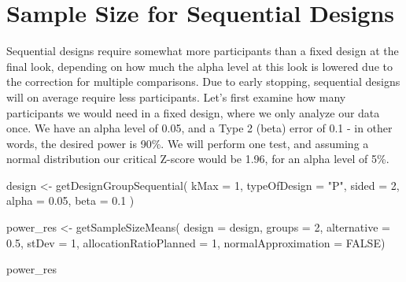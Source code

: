 \documentclass[
  oneside]{book}
\newenvironment{Shaded}{\begin{snugshade}}{\end{snugshade}}
\newcommand{\AttributeTok}[1]{\textcolor[rgb]{0.77,0.63,0.00}{#1}}
\newcommand{\ConstantTok}[1]{\textcolor[rgb]{0.00,0.00,0.00}{#1}}
\newcommand{\DecValTok}[1]{\textcolor[rgb]{0.00,0.00,0.81}{#1}}
\newcommand{\FloatTok}[1]{\textcolor[rgb]{0.00,0.00,0.81}{#1}}
\newcommand{\FunctionTok}[1]{\textcolor[rgb]{0.00,0.00,0.00}{#1}}
\newcommand{\NormalTok}[1]{#1}
\newcommand{\OtherTok}[1]{\textcolor[rgb]{0.56,0.35,0.01}{#1}}
\newcommand{\StringTok}[1]{\textcolor[rgb]{0.31,0.60,0.02}{#1}}
\begin{document}
\hypertarget{sample-size-for-sequential-designs}{%
\section{Sample Size for Sequential Designs}\label{sample-size-for-sequential-designs}}

Sequential designs require somewhat more participants than a fixed design at the final look, depending on how much the alpha level at this look is lowered due to the correction for multiple comparisons. Due to early stopping, sequential designs will on average require less participants. Let's first examine how many participants we would need in a fixed design, where we only analyze our data once. We have an alpha level of 0.05, and a Type 2 (beta) error of 0.1 - in other words, the desired power is 90\%. We will perform one test, and assuming a normal distribution our critical Z-score would be 1.96, for an alpha level of 5\%.

\begin{Shaded}
\begin{Highlighting}[]
\NormalTok{design }\OtherTok{\textless{}{-}} \FunctionTok{getDesignGroupSequential}\NormalTok{(}
  \AttributeTok{kMax =} \DecValTok{1}\NormalTok{,}
  \AttributeTok{typeOfDesign =} \StringTok{"P"}\NormalTok{,}
  \AttributeTok{sided =} \DecValTok{2}\NormalTok{,}
  \AttributeTok{alpha =} \FloatTok{0.05}\NormalTok{,}
  \AttributeTok{beta =} \FloatTok{0.1}
\NormalTok{)}

\NormalTok{power\_res }\OtherTok{\textless{}{-}} \FunctionTok{getSampleSizeMeans}\NormalTok{(}
  \AttributeTok{design =}\NormalTok{ design,}
  \AttributeTok{groups =} \DecValTok{2}\NormalTok{,}
  \AttributeTok{alternative =} \FloatTok{0.5}\NormalTok{, }
  \AttributeTok{stDev =} \DecValTok{1}\NormalTok{, }
  \AttributeTok{allocationRatioPlanned =} \DecValTok{1}\NormalTok{,}
  \AttributeTok{normalApproximation =} \ConstantTok{FALSE}\NormalTok{)}

\NormalTok{power\_res}
\end{Highlighting}
\end{Shaded}
\end{document}
